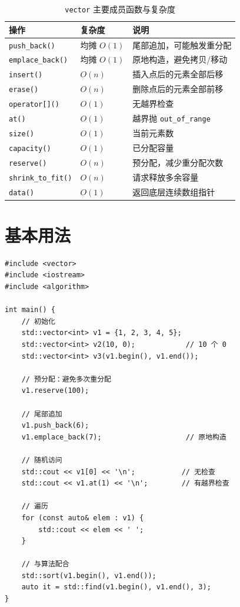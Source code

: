 \documentclass[12pt,a4paper,fontset=fandol]{ctexbook}
\newcommand{\Fn}[1]{\texttt{#1()}}
\newcommand{\Tp}[1]{\texttt{#1}}
\begin{document}
\begin{table}[htbp]
\centering
\caption{\Tp{vector} 主要成员函数与复杂度}
\begin{tabularx}{\textwidth}{l l >{\raggedright\arraybackslash}X}
\toprule
\textbf{操作} & \textbf{复杂度} & \textbf{说明} \\
\midrule
\Fn{push\_back}      & 均摊 $O(1)$ & 尾部追加，可能触发重分配 \\
\Fn{emplace\_back}   & 均摊 $O(1)$ & 原地构造，避免拷贝/移动 \\
\Fn{insert}          & $O(n)$      & 插入点后的元素全部后移 \\
\Fn{erase}           & $O(n)$      & 删除点后的元素全部前移 \\
\Fn{operator[]}      & $O(1)$      & 无越界检查 \\
\Fn{at}              & $O(1)$      & 越界抛 \texttt{out\_of\_range} \\
\Fn{size}            & $O(1)$      & 当前元素数 \\
\Fn{capacity}        & $O(1)$      & 已分配容量 \\
\Fn{reserve}         & $O(n)$      & 预分配，减少重分配次数 \\
\Fn{shrink\_to\_fit} & $O(n)$      & 请求释放多余容量 \\
\Fn{data}            & $O(1)$      & 返回底层连续数组指针 \\
\bottomrule
\end{tabularx}
\end{table}

\section{基本用法}

\begin{lstlisting}
#include <vector>
#include <iostream>
#include <algorithm>

int main() {
    // 初始化
    std::vector<int> v1 = {1, 2, 3, 4, 5};
    std::vector<int> v2(10, 0);            // 10 个 0
    std::vector<int> v3(v1.begin(), v1.end());

    // 预分配：避免多次重分配
    v1.reserve(100);

    // 尾部追加
    v1.push_back(6);
    v1.emplace_back(7);                    // 原地构造

    // 随机访问
    std::cout << v1[0] << '\n';           // 无检查
    std::cout << v1.at(1) << '\n';        // 有越界检查

    // 遍历
    for (const auto& elem : v1) {
        std::cout << elem << ' ';
    }

    // 与算法配合
    std::sort(v1.begin(), v1.end());
    auto it = std::find(v1.begin(), v1.end(), 3);
}
\end{lstlisting}
\end{document}
